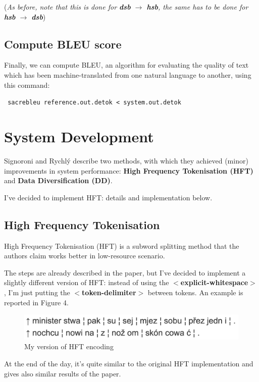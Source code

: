 \documentclass[12pt]{article}
\begin{document}
\vspace{0.2cm}
{\centering
(\textit{As before, note that this is done for \textbf{dsb} $\rightarrow$ \textbf{hsb}, the same has to be done for \textbf{hsb} $\rightarrow$ \textbf{dsb}})\par
}

\subsection{Compute BLEU score}
Finally, we can compute BLEU, an algorithm for evaluating the quality of text which has been machine-translated from one natural language to another, using this command:

\vspace{0.2cm}
\texttt{
sacrebleu reference.out.detok < system.out.detok
}

\section{System Development}
Signoroni and Rychlý describe two methods, with which they achieved (minor) improvements in system performance: \textbf{High Frequency Tokenisation (HFT)} and \textbf{Data Diversification (DD)}.

I've decided to implement HFT: details and implementation below.

\subsection{High Frequency Tokenisation}
High Frequency Tokenisation (HFT) is a subword splitting method that the authors claim works better in low-resource scenario. 

The steps are already described in the paper, but I've decided to implement a slightly different version of HFT:
instead of using the \textbf{$<$explicit-whitespace$>$}, I'm just putting the \textbf{$<$token-delimiter$>$} between tokens. 
An example is reported in Figure 4.

\begin{figure}
    \centering
    \includegraphics[width=0.7\linewidth]{./figures/hft_example.png}
    \caption{My version of HFT encoding}
    \label{fig:hft_example}
\end{figure}


At the end of the day, it's quite similar to the original HFT implementation and gives also similar results of the paper. 
\end{document}
